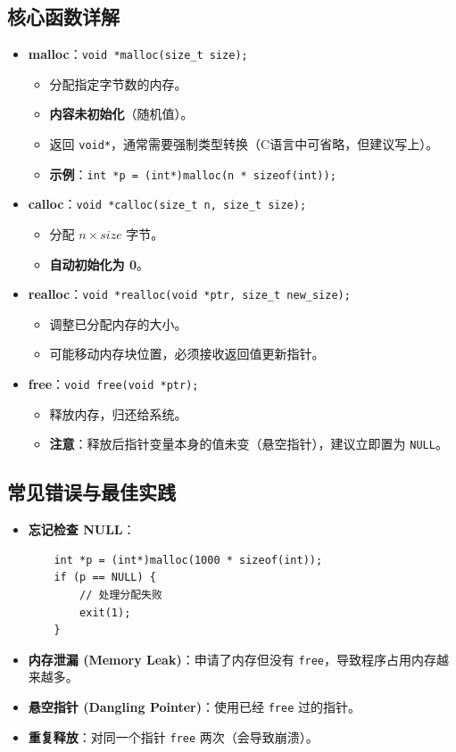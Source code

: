 \documentclass[a4paper,12pt]{article}
\begin{document}
\subsection{核心函数详解}
\begin{itemize}
    \item \textbf{malloc}：\texttt{void *malloc(size\_t size);}
    \begin{itemize}
        \item 分配指定字节数的内存。
        \item \textbf{内容未初始化}（随机值）。
        \item 返回 \texttt{void*}，通常需要强制类型转换（C语言中可省略，但建议写上）。
        \item \textbf{示例}：\texttt{int *p = (int*)malloc(n * sizeof(int));}
    \end{itemize}
    \item \textbf{calloc}：\texttt{void *calloc(size\_t n, size\_t size);}
    \begin{itemize}
        \item 分配 $n \times size$ 字节。
        \item \textbf{自动初始化为 0}。
    \end{itemize}
    \item \textbf{realloc}：\texttt{void *realloc(void *ptr, size\_t new\_size);}
    \begin{itemize}
        \item 调整已分配内存的大小。
        \item 可能移动内存块位置，必须接收返回值更新指针。
    \end{itemize}
    \item \textbf{free}：\texttt{void free(void *ptr);}
    \begin{itemize}
        \item 释放内存，归还给系统。
        \item \textbf{注意}：释放后指针变量本身的值未变（悬空指针），建议立即置为 \texttt{NULL}。
    \end{itemize}
\end{itemize}

\subsection{常见错误与最佳实践}
\begin{itemize}
    \item \textbf{忘记检查 NULL}：
    \begin{lstlisting}
    int *p = (int*)malloc(1000 * sizeof(int));
    if (p == NULL) {
        // 处理分配失败
        exit(1);
    }
    \end{lstlisting}
    \item \textbf{内存泄漏 (Memory Leak)}：申请了内存但没有 \texttt{free}，导致程序占用内存越来越多。
    \item \textbf{悬空指针 (Dangling Pointer)}：使用已经 \texttt{free} 过的指针。
    \item \textbf{重复释放}：对同一个指针 \texttt{free} 两次（会导致崩溃）。
\end{itemize}
\end{document}
